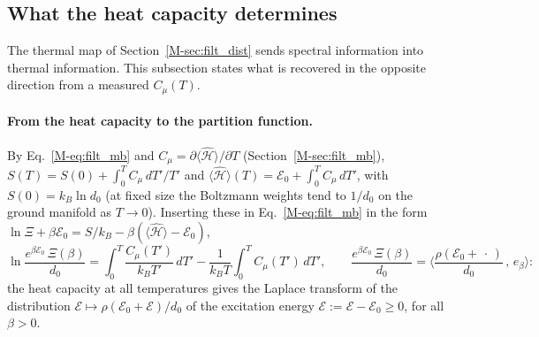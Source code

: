 \documentclass[10pt,a4paper]{article}
\theoremstyle{plain}
\theoremstyle{remark}
\newcommand{\cE}{\mathcal{E}}   %
\newcommand{\enrg}{\mathcal{E}}  %
\begin{document}
\subsection{What the heat capacity determines}
\label{app:cv}
\label{sec:filt_invert_mb}

The thermal map of Section~\ref{M-sec:filt_dist} sends spectral information
into thermal information. This subsection states what is recovered in the
opposite direction from a measured $C_\mu(T)$.

\paragraph{From the heat capacity to the partition function.} By
Eq.~\eqref{M-eq:filt_mb} and
$C_\mu=\partial\langle\hat{\mathcal H}\rangle/\partial T$
(Section~\ref{M-sec:filt_mb}),
$S(T)=S(0)+\int_0^TC_\mu\,dT'/T'$ and
$\langle\hat{\mathcal H}\rangle(T)=\enrg_0+\int_0^TC_\mu\,dT'$, with
$S(0)=k_B\ln d_0$ (at fixed size the Boltzmann weights tend to $1/d_0$ on
the ground manifold as $T\to0$). Inserting these in
Eq.~\eqref{M-eq:filt_mb} in the form
$\ln\Xi+\beta\enrg_0=S/k_B-\beta(\langle\hat{\mathcal H}\rangle-\enrg_0)$,
\begin{equation}\label{eq:filt_XifromC}
  \ln\frac{e^{\beta\enrg_0}\,\Xi(\beta)}{d_0}
  =\int_0^{T}\frac{C_\mu(T')}{k_BT'}\,dT'-\frac{1}{k_BT}\int_0^{T}C_\mu(T')\,dT' ,
  \qquad
  \frac{e^{\beta\enrg_0}\,\Xi(\beta)}{d_0}=\Big\langle\frac{\rho(\enrg_0+\,\cdot\,)}{d_0}\,,\,e_\beta\Big\rangle :
\end{equation}
the heat capacity at all temperatures gives the Laplace transform of the
distribution $\cE\mapsto\rho(\enrg_0+\cE)/d_0$ of the excitation energy
$\cE:=\enrg-\enrg_0\ge0$, for all $\beta>0$.
\end{document}
